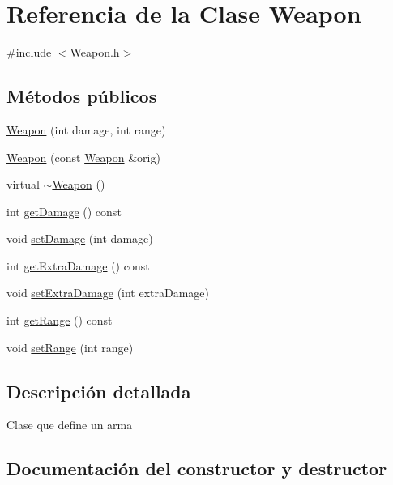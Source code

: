 \hypertarget{classWeapon}{}\section{Referencia de la Clase Weapon}
\label{classWeapon}


{\ttfamily \#include $<$Weapon.\+h$>$}

\subsection*{Métodos públicos}
\begin{DoxyCompactItemize}
\item 
\hyperlink{classWeapon_a026a6d80c7b04f9f8195835b012fec0a}{Weapon} (int damage, int range)
\item 
\hyperlink{classWeapon_aa2a51300ee84fa1281a3eebeb81ea05d}{Weapon} (const \hyperlink{classWeapon}{Weapon} \&orig)
\item 
virtual \hyperlink{classWeapon_a420e7ba3d2017e6de3e93eb579cfd3fa}{$\sim$\+Weapon} ()
\item 
int \hyperlink{classWeapon_a2ca6127e73e6afe823b5daf59d9e93c5}{get\+Damage} () const 
\item 
void \hyperlink{classWeapon_a54e4b500dcc3f5c3d02df6f1c29ddbea}{set\+Damage} (int damage)
\item 
int \hyperlink{classWeapon_a9bd98ad8803ea7933e4a11d52e5f458a}{get\+Extra\+Damage} () const 
\item 
void \hyperlink{classWeapon_a5b61dea8e2eb6048a846c5fa823d85f5}{set\+Extra\+Damage} (int extra\+Damage)
\item 
int \hyperlink{classWeapon_afb8b8a4035ddf75bdcde45a42386a9d1}{get\+Range} () const 
\item 
void \hyperlink{classWeapon_a9227da33ba03135c9df353a91a7b0013}{set\+Range} (int range)
\end{DoxyCompactItemize}


\subsection{Descripción detallada}
Clase que define un arma 

\subsection{Documentación del constructor y destructor}
\hypertarget{classWeapon_a026a6d80c7b04f9f8195835b012fec0a}{}
